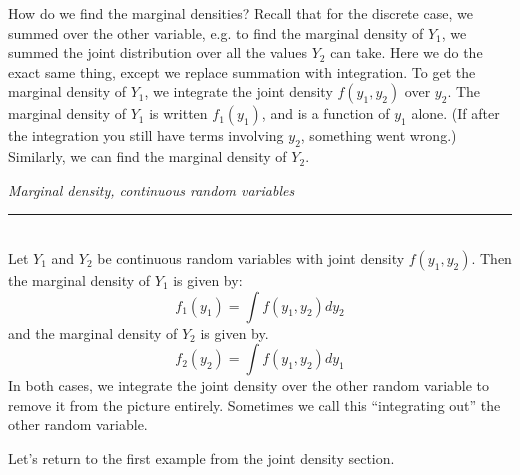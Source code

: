 \documentclass[notes.tex]{subfiles}
\begin{document}
How do we find the marginal densities? Recall that for the discrete case, we summed over the other variable, e.g. to find the marginal density of $Y_1$, we summed the joint distribution over all the values $Y_2$ can take. Here we do the exact same thing, except we replace summation with integration. To get the marginal density of $Y_1$, we integrate the joint density $f(y_1, y_2)$ over $y_2$. The marginal density of $Y_1$ is written $f_1(y_1)$, and is a function of $y_1$ alone. (If after the integration you still have terms involving $y_2$, something went wrong.) Similarly, we can find the marginal density of $Y_2$.

\begin{framed}

\emph{Marginal density, continuous random variables}\\
  \rule{\dimexpr{}\fboxrule}{.1pt} \\
Let $Y_1$ and $Y_2$ be continuous random variables with joint density $f(y_1, y_2)$. Then the marginal density of $Y_1$ is given by:
\[
f_1(y_1) = \int f(y_1, y_2) dy_2
\]
and the marginal density of $Y_2$ is given by.
\[
f_2(y_2) = \int f(y_1, y_2) dy_1
\]
In both cases, we integrate the joint density over the other random variable to remove it from the picture entirely. Sometimes we call this ``integrating out'' the other random variable.
\end{framed}

Let's return to the first example from the joint density section.
\end{document}
